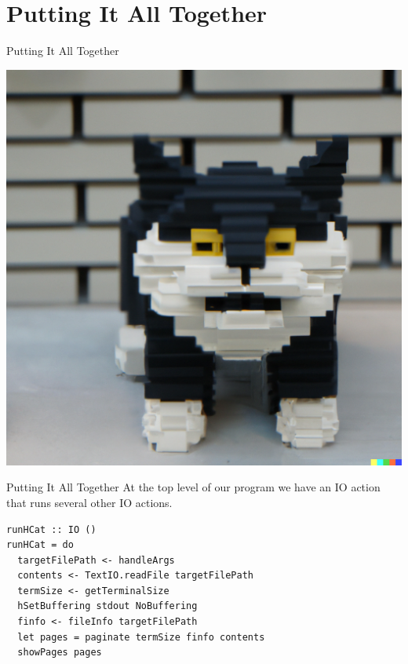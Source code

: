 \documentclass[10pt, presentation, colorlinks]{beamer}
\begin{document}
\section{Putting It All Together}
\label{sec:orgf5bbb60}

\begin{frame}[label={sec:org0d90149}]{Putting It All Together}
\begin{center}
\includegraphics[height=0.5\textheight]{img/cat.png}
\end{center}
\end{frame}

\begin{frame}[label={sec:orgb689845},fragile]{Putting It All Together}
 At the top level of our program we have an IO action that runs several
other IO actions.

\begin{verbatim}
runHCat :: IO ()
runHCat = do
  targetFilePath <- handleArgs
  contents <- TextIO.readFile targetFilePath
  termSize <- getTerminalSize
  hSetBuffering stdout NoBuffering
  finfo <- fileInfo targetFilePath
  let pages = paginate termSize finfo contents
  showPages pages
\end{verbatim}
\end{frame}
\end{document}
